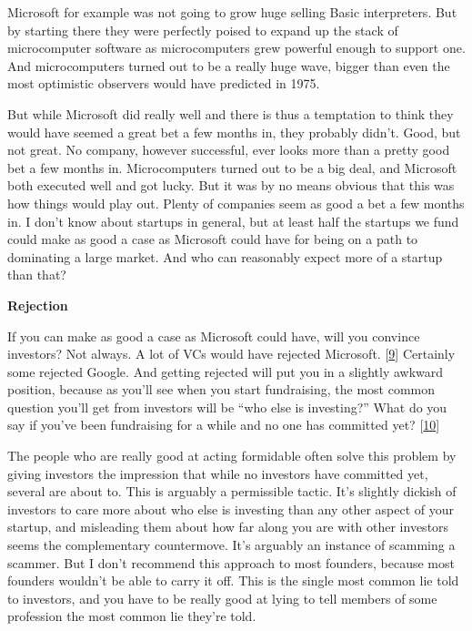 Microsoft for example was not going to grow huge selling Basic
interpreters. But by starting there they were perfectly poised to expand
up the stack of microcomputer software as microcomputers grew powerful
enough to support one. And microcomputers turned out to be a really huge
wave, bigger than even the most optimistic observers would have
predicted in 1975.

But while Microsoft did really well and there is thus a temptation to
think they would have seemed a great bet a few months in, they probably
didn't. Good, but not great. No company, however successful, ever looks
more than a pretty good bet a few months in. Microcomputers turned out
to be a big deal, and Microsoft both executed well and got lucky. But it
was by no means obvious that this was how things would play out. Plenty
of companies seem as good a bet a few months in. I don't know about
startups in general, but at least half the startups we fund could make
as good a case as Microsoft could have for being on a path to dominating
a large market. And who can reasonably expect more of a startup than
that?

\textbf{Rejection}

If you can make as good a case as Microsoft could have, will you
convince investors? Not always. A lot of VCs would have rejected
Microsoft. {[}\hyperref[f9n]{9}{]} Certainly some rejected Google. And
getting rejected will put you in a slightly awkward position, because as
you'll see when you start fundraising, the most common question you'll
get from investors will be ``who else is investing?'' What do you say if
you've been fundraising for a while and no one has committed yet?
{[}\hyperref[f10n]{10}{]}

The people who are really good at acting formidable often solve this
problem by giving investors the impression that while no investors have
committed yet, several are about to. This is arguably a permissible
tactic. It's slightly dickish of investors to care more about who else
is investing than any other aspect of your startup, and misleading them
about how far along you are with other investors seems the complementary
countermove. It's arguably an instance of scamming a scammer. But I
don't recommend this approach to most founders, because most founders
wouldn't be able to carry it off. This is the single most common lie
told to investors, and you have to be really good at lying to tell
members of some profession the most common lie they're told.

